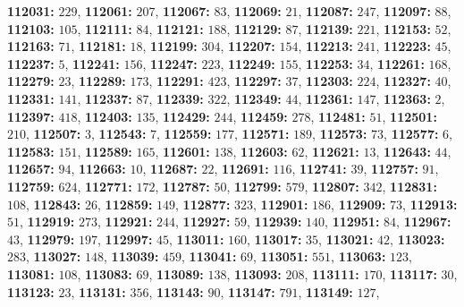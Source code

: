 \textsf{\bfseries 112031:} $229$, \textsf{\bfseries 112061:} $207$, \textsf{\bfseries 112067:} $83$, \textsf{\bfseries 112069:} $21$, \textsf{\bfseries 112087:} $247$, \textsf{\bfseries 112097:} $88$, \textsf{\bfseries 112103:} $105$, \textsf{\bfseries 112111:} $84$, \textsf{\bfseries 112121:} $188$, \textsf{\bfseries 112129:} $87$, \textsf{\bfseries 112139:} $221$, \textsf{\bfseries 112153:} $52$, \textsf{\bfseries 112163:} $71$, \textsf{\bfseries 112181:} $18$, \textsf{\bfseries 112199:} $304$, \textsf{\bfseries 112207:} $154$, \textsf{\bfseries 112213:} $241$, \textsf{\bfseries 112223:} $45$, \textsf{\bfseries 112237:} $5$, \textsf{\bfseries 112241:} $156$, \textsf{\bfseries 112247:} $223$, \textsf{\bfseries 112249:} $155$, \textsf{\bfseries 112253:} $34$, \textsf{\bfseries 112261:} $168$, \textsf{\bfseries 112279:} $23$, \textsf{\bfseries 112289:} $173$, \textsf{\bfseries 112291:} $423$, \textsf{\bfseries 112297:} $37$, \textsf{\bfseries 112303:} $224$, \textsf{\bfseries 112327:} $40$, \textsf{\bfseries 112331:} $141$, \textsf{\bfseries 112337:} $87$, \textsf{\bfseries 112339:} $322$, \textsf{\bfseries 112349:} $44$, \textsf{\bfseries 112361:} $147$, \textsf{\bfseries 112363:} $2$, \textsf{\bfseries 112397:} $418$, \textsf{\bfseries 112403:} $135$, \textsf{\bfseries 112429:} $244$, \textsf{\bfseries 112459:} $278$, \textsf{\bfseries 112481:} $51$, \textsf{\bfseries 112501:} $210$, \textsf{\bfseries 112507:} $3$, \textsf{\bfseries 112543:} $7$, \textsf{\bfseries 112559:} $177$, \textsf{\bfseries 112571:} $189$, \textsf{\bfseries 112573:} $73$, \textsf{\bfseries 112577:} $6$, \textsf{\bfseries 112583:} $151$, \textsf{\bfseries 112589:} $165$, \textsf{\bfseries 112601:} $138$, \textsf{\bfseries 112603:} $62$, \textsf{\bfseries 112621:} $13$, \textsf{\bfseries 112643:} $44$, \textsf{\bfseries 112657:} $94$, \textsf{\bfseries 112663:} $10$, \textsf{\bfseries 112687:} $22$, \textsf{\bfseries 112691:} $116$, \textsf{\bfseries 112741:} $39$, \textsf{\bfseries 112757:} $91$, \textsf{\bfseries 112759:} $624$, \textsf{\bfseries 112771:} $172$, \textsf{\bfseries 112787:} $50$, \textsf{\bfseries 112799:} $579$, \textsf{\bfseries 112807:} $342$, \textsf{\bfseries 112831:} $108$, \textsf{\bfseries 112843:} $26$, \textsf{\bfseries 112859:} $149$, \textsf{\bfseries 112877:} $323$, \textsf{\bfseries 112901:} $186$, \textsf{\bfseries 112909:} $73$, \textsf{\bfseries 112913:} $51$, \textsf{\bfseries 112919:} $273$, \textsf{\bfseries 112921:} $244$, \textsf{\bfseries 112927:} $59$, \textsf{\bfseries 112939:} $140$, \textsf{\bfseries 112951:} $84$, \textsf{\bfseries 112967:} $43$, \textsf{\bfseries 112979:} $197$, \textsf{\bfseries 112997:} $45$, \textsf{\bfseries 113011:} $160$, \textsf{\bfseries 113017:} $35$, \textsf{\bfseries 113021:} $42$, \textsf{\bfseries 113023:} $283$, \textsf{\bfseries 113027:} $148$, \textsf{\bfseries 113039:} $459$, \textsf{\bfseries 113041:} $69$, \textsf{\bfseries 113051:} $551$, \textsf{\bfseries 113063:} $123$, \textsf{\bfseries 113081:} $108$, \textsf{\bfseries 113083:} $69$, \textsf{\bfseries 113089:} $138$, \textsf{\bfseries 113093:} $208$, \textsf{\bfseries 113111:} $170$, \textsf{\bfseries 113117:} $30$, \textsf{\bfseries 113123:} $23$, \textsf{\bfseries 113131:} $356$, \textsf{\bfseries 113143:} $90$, \textsf{\bfseries 113147:} $791$, \textsf{\bfseries 113149:} $127$, 

